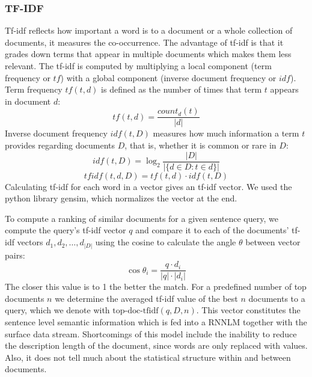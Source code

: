 \documentclass[a4paper]{article}
\begin{document}
\subsubsection{TF-IDF}
Tf-idf \cite{salton1986introduction} reflects how important a word is to a document or a whole collection of documents, it measures the co-occurrence. The advantage of tf-idf is that it grades down terms that appear in multiple documents which makes them less relevant.
The tf-idf is computed by multiplying a local component (term frequency or $tf$) with a global component (inverse document frequency or $idf$). Term frequency $tf(t, d)$ is defined as the number of times that term $t$ appears in document $d$:
\begin{equation} 
tf(t,d)=\dfrac{count_d(t)}{|d|}
\end{equation}
Inverse document frequency $idf(t, D)$ measures how much information a term $t$ provides regarding documents $D$, that is, whether it is common or rare in $D$:
\begin{equation}
idf(t,D)= \log_2{ \dfrac{|D|}{|\{d \in D: t \in d\}|}}
\end{equation}
\begin{equation}
tfidf(t, d, D) = tf(t,d) \cdot idf(t,D)
\end{equation}
Calculating tf-idf for each word in a vector gives an tf-idf vector. We used the python library gensim, which normalizes the vector at the end.

To compute a ranking of similar documents for a given sentence query, we compute the query's tf-idf vector $q$ and compare it to each of the documents' tf-idf vectors $d_1, d_2, \ldots, d_{|D|}$ using the cosine to calculate the angle $\theta$ between vector pairs:
\begin{equation} \label{eq:cos-similar}
\cos \theta_i = \dfrac{q \cdot d_i}{|q| \cdot |d_i|}
\end{equation} 
The closer this value is to 1 the better the match.
For a predefined number of top documents $n$ we determine the averaged tf-idf value of the best $n$ documents to a query, which we denote with $\text{top-doc-tfidf}(q, D, n)$.
This vector constitutes the sentence level semantic information which is fed into a RNNLM together with the surface data stream.
Shortcomings of this model include the inability to reduce the description length of the document, since words are only replaced with values. Also, it does not tell much about the statistical structure within and between documents.
\end{document}

